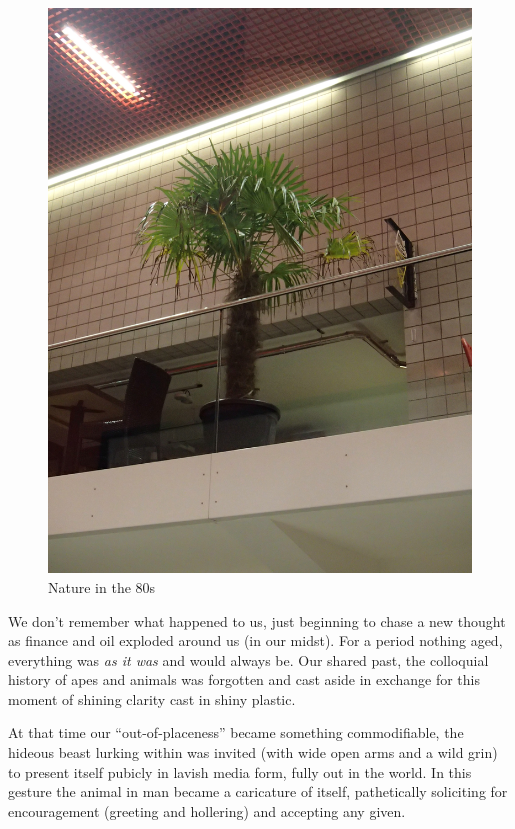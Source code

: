 \documentclass{book}
\begin{document}
\begin{figure}
\centering
\includegraphics[width=\textwidth,angle=-90]{figures/P1050152.JPG}
\caption{Nature in the 80s}
\end{figure}

We don't remember what happened to us, just beginning to chase a new thought as
finance and oil exploded around us (in our midst). For a period nothing aged,
everything was \emph{as it was} and would always be. Our shared past, the
colloquial history of apes and animals was forgotten and cast aside in exchange
for this moment of shining clarity cast in shiny plastic.

At that time our ``out-of-placeness'' became something commodifiable, the
hideous beast lurking within was invited (with wide open arms and a wild grin)
to present itself pubicly in lavish media form, fully out in the world. In this
gesture the animal in man became a caricature of itself, pathetically
soliciting for encouragement (greeting and hollering) and accepting any given.
\end{document}
